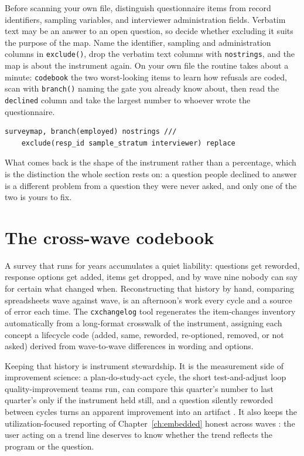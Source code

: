 Before scanning your own file, distinguish questionnaire items from record identifiers, sampling variables, and interviewer administration fields. Verbatim text may be an answer to an open question, so decide whether excluding it suits the purpose of the map. Name the identifier, sampling and administration columns in \texttt{exclude()}, drop the verbatim text columns with \texttt{nostrings}, and the map is about the instrument again. On your own file the routine takes about a minute: \texttt{codebook} the two worst-looking items to learn how refusals are coded, scan with \texttt{branch()} naming the gate you already know about, then read the \texttt{declined} column and take the largest number to whoever wrote the questionnaire.
\par
{\footnotesize
\begin{verbatim}
surveymap, branch(employed) nostrings ///
    exclude(resp_id sample_stratum interviewer) replace
\end{verbatim}
}
What comes back is the shape of the instrument rather than a percentage, which is the distinction the whole section rests on: a question people declined to answer is a different problem from a question they were never asked, and only one of the two is yours to fix.

\section{The cross-wave codebook}\label{sec:cxchangelog}
A survey that runs for years accumulates a quiet liability: questions get reworded, response options get added, items get dropped, and by wave nine nobody can say for certain what changed when. Reconstructing that history by hand, comparing spreadsheets wave against wave, is an afternoon's work every cycle and a source of error each time. The \texttt{cxchangelog} tool regenerates the item-changes inventory automatically from a long-format crosswalk of the instrument, assigning each concept a lifecycle code (added, same, reworded, re-optioned, removed, or not asked) derived from wave-to-wave differences in wording and options.

Keeping that history is instrument stewardship. It is the measurement side of improvement science: a plan-do-study-act cycle, the short test-and-adjust loop quality-improvement teams run, can compare this quarter's number to last quarter's only if the instrument held still, and a question silently reworded between cycles turns an apparent improvement into an artifact \parencite{bryk2015improve}. It also keeps the utilization-focused reporting of Chapter~\ref{ch:embedded} honest across waves \parencite{patton2008utilization}: the user acting on a trend line deserves to know whether the trend reflects the program or the question.


